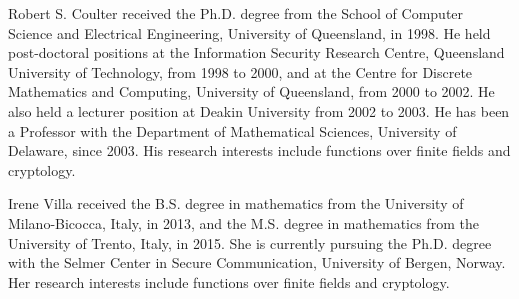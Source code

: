 \documentclass[10pt]{article}
\begin{document}
Robert S. Coulter received the Ph.D. degree from the School of Computer Science and Electrical Engineering, University of Queensland, in 1998. He held post-doctoral positions at the Information Security Research Centre, Queensland University of Technology, from 1998 to 2000, and at the Centre for Discrete Mathematics and Computing, University of Queensland, from 2000 to 2002. He also held a lecturer position at Deakin University from 2002 to 2003. He has been a Professor with the Department of Mathematical Sciences, University of Delaware, since 2003. His research interests include functions over finite fields and cryptology.

Irene Villa received the B.S. degree in mathematics from the University of Milano-Bicocca, Italy, in 2013, and the M.S. degree in mathematics from the University of Trento, Italy, in 2015. She is currently pursuing the Ph.D. degree with the Selmer Center in Secure Communication, University of Bergen, Norway. Her research interests include functions over finite fields and cryptology.
\end{document}

